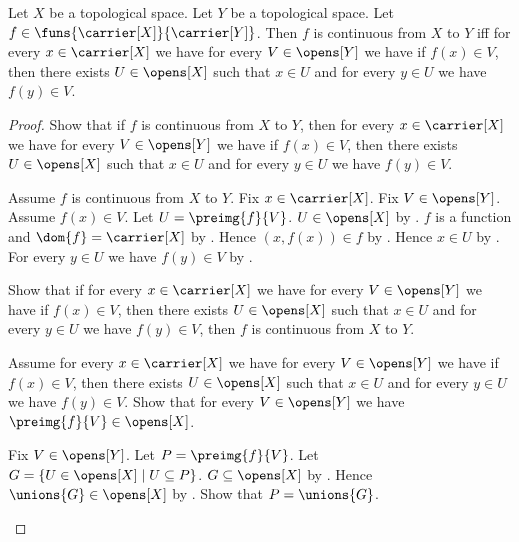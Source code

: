 \begin{theorem}\label{continuous_iff_open_local}
    Let $X$ be a topological space.
    Let $Y$ be a topological space.
    Let $f\in\funs{\carrier[X]}{\carrier[Y]}$.
    Then $f$ is continuous from $X$ to $Y$ iff
        for every $x\in\carrier[X]$ we have
        for every $V\in\opens[Y]$ we have if $f(x)\in V$, then there exists
            $U\in\opens[X]$ such that $x\in U$ and
            for every $y\in U$ we have $f(y)\in V$.
\end{theorem}
\begin{proof}
    Show that if $f$ is continuous from $X$ to $Y$, then
        for every $x\in\carrier[X]$ we have
        for every $V\in\opens[Y]$ we have if $f(x)\in V$, then there exists
            $U\in\opens[X]$ such that $x\in U$ and
            for every $y\in U$ we have $f(y)\in V$.
    \begin{subproof}
        Assume $f$ is continuous from $X$ to $Y$.
        Fix $x\in\carrier[X]$.
        Fix $V\in\opens[Y]$.
        Assume $f(x)\in V$.
        Let $U=\preimg{f}{V}$.
        $U\in\opens[X]$ by .
        $f$ is a function and $\dom{f}=\carrier[X]$
            by .
        Hence $(x,f(x))\in f$ by .
        Hence $x\in U$ by .
        For every $y\in U$ we have $f(y)\in V$
            by
            .
    \end{subproof}
    Show that if for every $x\in\carrier[X]$ we have
        for every $V\in\opens[Y]$ we have if $f(x)\in V$, then there exists
            $U\in\opens[X]$ such that $x\in U$ and
            for every $y\in U$ we have $f(y)\in V$, then
        $f$ is continuous from $X$ to $Y$.
    \begin{subproof}
        Assume for every $x\in\carrier[X]$ we have
            for every $V\in\opens[Y]$ we have if $f(x)\in V$, then there exists
                $U\in\opens[X]$ such that $x\in U$ and
                for every $y\in U$ we have $f(y)\in V$.
        Show that for every $V\in\opens[Y]$ we have
            $\preimg{f}{V}\in\opens[X]$.
        \begin{subproof}
            Fix $V\in\opens[Y]$.
            Let $P=\preimg{f}{V}$.
            Let $G=\{U\in\opens[X]\mid U\subseteq P\}$.
            $G\subseteq\opens[X]$ by .
            Hence $\unions{G}\in\opens[X]$ by .
            Show that $P=\unions{G}$.
            \begin{subproof}

\end{subproof}
\end{subproof}
\end{subproof}
\end{proof}
